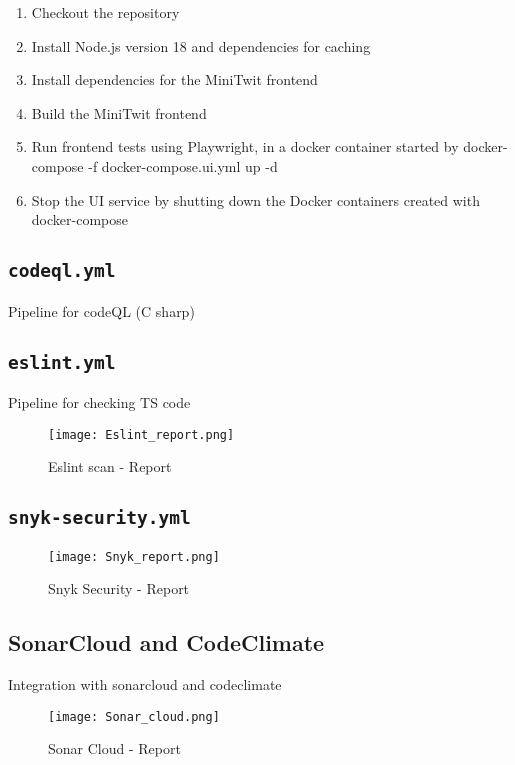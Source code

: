 \begin{enumerate}
    \item Checkout the repository
    \item Install Node.js version 18 and dependencies for caching
    \item Install dependencies for the MiniTwit frontend
    \item Build the MiniTwit frontend
    \item Run frontend tests using Playwright, in a docker container started by docker-compose -f docker-compose.ui.yml up -d
    \item Stop the UI service by shutting down the Docker containers created with docker-compose
\end{enumerate}

\subsection{\texttt{codeql.yml}}
Pipeline for codeQL (C sharp) 

\subsection{\texttt{eslint.yml}}
Pipeline for checking TS code

\begin{figure}[H]
    \centering
    \texttt{[image: Eslint\_report.png]}
    \caption{Eslint scan - Report}
    \label{fig:my_label}
\end{figure}

\subsection{\texttt{snyk-security.yml}}

\begin{figure}[H]
    \centering
    \texttt{[image: Snyk\_report.png]}
    \caption{Snyk Security - Report}
    \label{fig:my_label}
\end{figure}

\subsection{SonarCloud and CodeClimate}
Integration with sonarcloud and codeclimate

\begin{figure}[H]
    \centering
    \texttt{[image: Sonar\_cloud.png]}
    \caption{Sonar Cloud - Report}
    \label{fig:my_label}
\end{figure}

